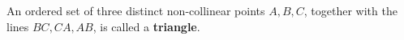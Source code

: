 An ordered set of three distinct non-collinear points $A, B, C$, together with the lines $BC, CA, AB$, is called a \textbf{triangle}.

